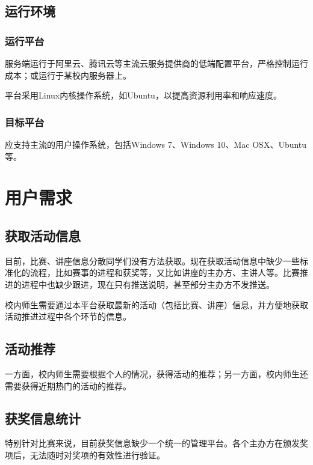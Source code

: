 \documentclass[a4paper,12pt]{article}
\begin{document}
    \subsection{运行环境} %
    \label{sub:运行环境}
    \subsubsection{运行平台} %
    \label{ssub:运行平台}
    服务端运行于阿里云、腾讯云等主流云服务提供商的低端配置平台，严格控制运行成本；或运行于某校内服务器上。

    平台采用Linux内核操作系统，如Ubuntu，以提高资源利用率和响应速度。
    \subsubsection{目标平台} %
    \label{ssub:目标平台}
    应支持主流的用户操作系统，包括Windows 7、Windows 10、Mac OSX、Ubuntu等。
    \section{用户需求} %
    \label{sec:用户需求}
    \subsection{获取活动信息} %
    \label{sub:获取活动信息}
    目前，比赛、讲座信息分散同学们没有方法获取。现在获取活动信息中缺少一些标准化的流程，比如赛事的进程和获奖等，又比如讲座的主办方、主讲人等。比赛推进的进程中也缺少跟进，现在只有推送说明，甚至部分主办方不发推送。

    校内师生需要通过本平台获取最新的活动（包括比赛、讲座）信息，并方便地获取活动推进过程中各个环节的信息。
    \subsection{活动推荐} %
    \label{sub:活动推荐}
    一方面，校内师生需要根据个人的情况，获得活动的推荐；另一方面，校内师生还需要获得近期热门的活动的推荐。
    \subsection{获奖信息统计} %
    \label{sub:获奖信息统计}
    特别针对比赛来说，目前获奖信息缺少一个统一的管理平台。各个主办方在颁发奖项后，无法随时对奖项的有效性进行验证。
\end{document}
